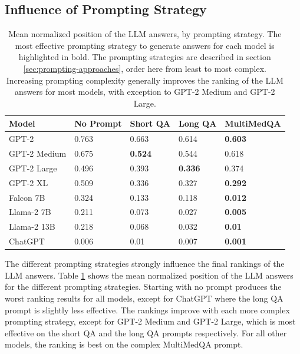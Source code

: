 \subsection{Influence of Prompting Strategy}
\begin{table}[tb]
\centering
\begin{tabular}{lllll}
\hline
\textbf{Model}        & \textbf{No Prompt} & \textbf{Short QA}     & \textbf{Long QA} & \textbf{MultiMedQA} \\\hline
GPT-2        & 0.763      & 0.663 & 0.614    & \textbf{0.603}      \\
GPT-2 Medium & 0.675      & \textbf{0.524} & 0.544    & 0.618      \\
GPT-2 Large  & 0.496      & 0.393 & \textbf{0.336}    & 0.374      \\
GPT-2 XL     & 0.509      & 0.336 & 0.327    & \textbf{0.292}      \\
Falcon 7B    & 0.324      & 0.133 & 0.118    & \textbf{0.012}      \\
Llama-2 7B   & 0.211      & 0.073 & 0.027    & \textbf{0.005}      \\
Llama-2 13B  & 0.218      & 0.068 & 0.032    & \textbf{0.01 }      \\
ChatGPT      & 0.006      & 0.01  & 0.007    & \textbf{0.001}     \\
\hline
\end{tabular}
\caption{Mean normalized position of the LLM answers, by prompting strategy.
The most effective prompting strategy to generate answers for each model is highlighted in bold.
The prompting strategies are described in section \ref{sec:prompting-approaches}, order here from least to most complex.
Increasing prompting complexity generally improves the ranking of the LLM answers for most models, with exception to GPT-2 Medium and GPT-2 Large.
}
\label{tab:prompting_strategy}
\end{table}
The different prompting strategies strongly influence the final rankings of the LLM answers.
Table \ref{tab:prompting_strategy} shows the mean normalized position of the LLM answers for the different prompting strategies.
Starting with no prompt produces the worst ranking results for all models, except for ChatGPT where the long QA prompt is slightly less effective.
The rankings improve with each more complex prompting strategy, except for GPT-2 Medium and GPT-2 Large, which is most effective on the short QA and the long QA prompts respectively.
For all other models, the ranking is best on the complex MultiMedQA prompt.

